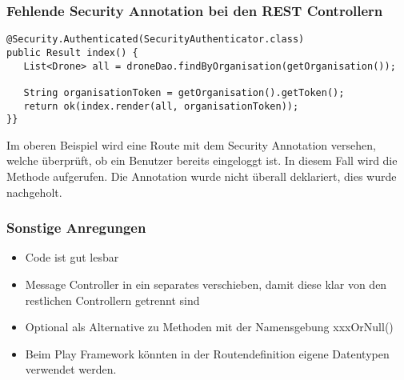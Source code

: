 \subsubsection{Fehlende Security Annotation bei den REST Controllern}
\begin{lstlisting}
@Security.Authenticated(SecurityAuthenticator.class)
public Result index() {
   List<Drone> all = droneDao.findByOrganisation(getOrganisation());
   
   String organisationToken = getOrganisation().getToken();
   return ok(index.render(all, organisationToken));
}}
\end{lstlisting}

Im oberen Beispiel wird eine Route mit dem Security Annotation versehen, welche überprüft, ob ein Benutzer bereits eingeloggt ist. In diesem Fall wird die Methode aufgerufen. Die Annotation wurde nicht überall deklariert, dies wurde nachgeholt.


\subsubsection{Sonstige Anregungen}
\begin{itemize}
	\item{Code ist gut lesbar}
	\item{Message Controller in ein separates verschieben, damit diese klar von den restlichen Controllern getrennt sind}
	\item{Optional als Alternative zu Methoden mit der Namensgebung xxxOrNull()}
	\item{
	Beim Play Framework könnten in der Routendefinition eigene Datentypen verwendet werden. }
\end{itemize}
